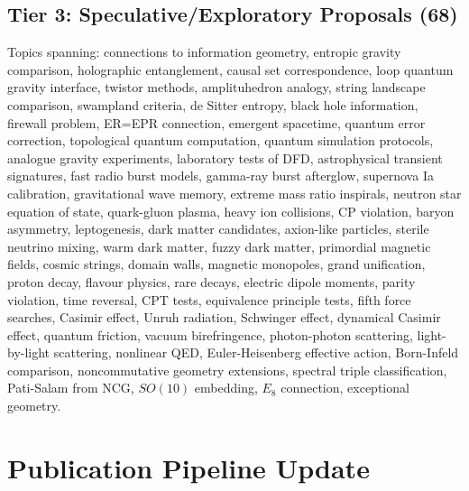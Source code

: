 \documentclass[11pt,a4paper]{article}
\begin{document}
\subsection{Tier 3: Speculative/Exploratory Proposals (68)}

Topics spanning: connections to information geometry, entropic gravity comparison, holographic entanglement, causal set correspondence, loop quantum gravity interface, twistor methods, amplituhedron analogy, string landscape comparison, swampland criteria, de Sitter entropy, black hole information, firewall problem, ER=EPR connection, emergent spacetime, quantum error correction, topological quantum computation, quantum simulation protocols, analogue gravity experiments, laboratory tests of DFD, astrophysical transient signatures, fast radio burst models, gamma-ray burst afterglow, supernova Ia calibration, gravitational wave memory, extreme mass ratio inspirals, neutron star equation of state, quark-gluon plasma, heavy ion collisions, CP violation, baryon asymmetry, leptogenesis, dark matter candidates, axion-like particles, sterile neutrino mixing, warm dark matter, fuzzy dark matter, primordial magnetic fields, cosmic strings, domain walls, magnetic monopoles, grand unification, proton decay, flavour physics, rare decays, electric dipole moments, parity violation, time reversal, CPT tests, equivalence principle tests, fifth force searches, Casimir effect, Unruh radiation, Schwinger effect, dynamical Casimir effect, quantum friction, vacuum birefringence, photon-photon scattering, light-by-light scattering, nonlinear QED, Euler-Heisenberg effective action, Born-Infeld comparison, noncommutative geometry extensions, spectral triple classification, Pati-Salam from NCG, $SO(10)$ embedding, $E_8$ connection, exceptional geometry.


\section{Publication Pipeline Update}
\end{document}
